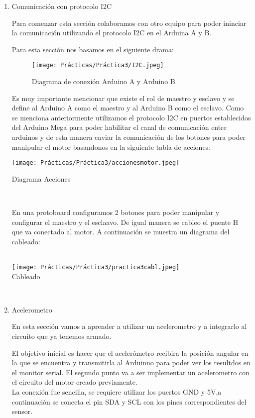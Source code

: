 \documentclass[conference]{IEEEtran}
\begin{document}
\begin{enumerate}
    \item Comunicación con protocolo I2C
    \par Para comenzar esta sección colaboramos con otro equipo para poder ininciar la comunicación utilizando el protocolo I2C en el Arduina A y B.
    \par Para esta sección nos basamos en el siguiente drama:
    
    \begin{figure}[htbp]
\texttt{[image: Prácticas/Práctica3/I2C.jpeg]}
\caption{Diagrama de conexión Arduino A y Arduino B}
\label{fig}
\end{figure}
    
    \par Es muy importante mencionar que existe el rol de maestro y esclavo y se define al Arduino A como el maestro y al Arduino B como el esclavo. Como se menciona anteriormente utilizamos el protocolo I2C en puertos establecidos del Arduino Mega para poder habilitar el canal de comunicación entre arduinos y de esta manera enviar la comunicación de los botones para poder manipular el motor basandonos en la siguiente tabla de acciones:
    \\

    \begin{center}
    \texttt{[image: Prácticas/Práctica3/accionesmotor.jpeg]}
    \caption{Diagrama Acciones}
    \label{fig}
    \end{center}\\
    
    \par En una protoboard configuramos 2 botones  para poder manipular y configurar el maestro y el esclaavo. De igual manera se cableo el puente H que va conectado al motor. A continuación se muestra un diagrama del cableado:\\\\
    
    \begin{center}
    \texttt{[image: Prácticas/Práctica3/practica3cabl.jpeg]}\\
    \caption{Cableado}
    \label{fig}
    \end{center}  \\
    
    
    \item Acelerometro\\
    \par En esta sección vamos a aprender a utilizar un acelerometro y a integrarlo al circuito que ya tenemos armado.
    \par 
    \par El objetivo inicial es hacer que el acelerómetro recibira la posición angular en la que se encuentra  y transmitirla al Arduinno para poder ver los resultdos en el monitor serial.  El segundo punto va a ser implementar un acelerometro con el circuito del motor creado previamente.\\
    La conexión fue sencilla, se requiere utilizar los puertos GND y 5V,a continuación se conecta el pin SDA y SCL con los pines correspondientes del sensor.\\



\end{enumerate}
\end{document}
